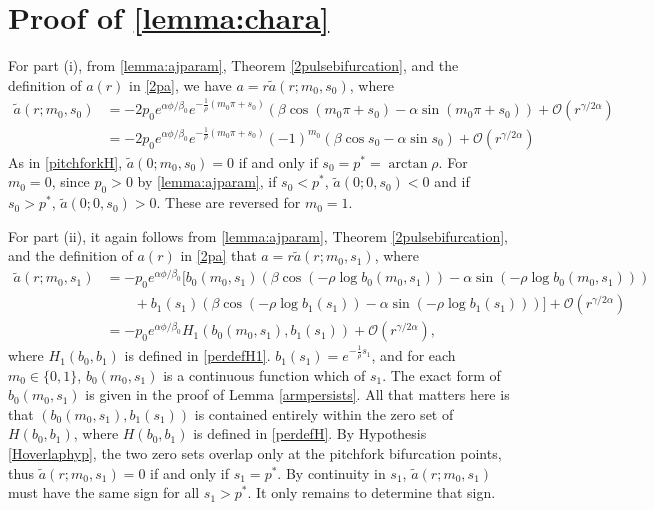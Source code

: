 \documentclass[thesis.tex]{subfiles}
\begin{document}
\section{Proof of \cref{lemma:chara}}

For part (i), from \cref{lemma:ajparam}, Theorem \cref{2pulsebifurcation}, and the definition of $a(r)$ in \cref{2pa}, we have $a = r \tilde{a}(r; m_0, s_0)$, where
\begin{align*}
\tilde{a}(r; m_0, s_0) &= -2 p_0 e^{\alpha \phi/\beta_0} e^{-\frac{1}{\rho}(m_0 \pi + s_0)} \left( \beta \cos\left(m_0 \pi + s_0 \right) - \alpha \sin \left(m_0 \pi + s_0 \right) \right) + \mathcal{O}(r^{\gamma/2\alpha}) \\
&= -2 p_0 e^{\alpha \phi/\beta_0} e^{-\frac{1}{\rho}(m_0 \pi + s_0)} (-1)^{m_0} \left( \beta \cos s_0 - \alpha \sin s_0 \right) + \mathcal{O}(r^{\gamma/2\alpha})
\end{align*}
As in \cref{pitchforkH}, $\tilde{a}(0; m_0, s_0) = 0$ if and only if $s_0 = p^* = \arctan \rho$. For $m_0 = 0$, since $p_0 > 0$ by \cref{lemma:ajparam}, if $s_0 < p^*$, $\tilde{a}(0; 0, s_0) < 0$ and if $s_0 > p^*$, $\tilde{a}(0; 0, s_0) > 0$. These are reversed for $m_0 = 1$.

For part (ii), it again follows from \cref{lemma:ajparam}, Theorem \cref{2pulsebifurcation}, and the definition of $a(r)$ in \cref{2pa} that $a = r \tilde{a}(r; m_0, s_1)$, where
\begin{align*}
\tilde{a}(r; m_0, s_1) &= -p_0 e^{\alpha \phi/\beta_0} \Big[ b_0(m_0, s_1) \left( \beta \cos\left(-\rho \log b_0(m_0, s_1) \right) - \alpha \sin \left(-\rho \log b_0(m_0, s_1) \right) \right) \\
&\qquad+ b_1(s_1) \left( \beta \cos\left(-\rho \log b_1(s_1) \right) - \alpha \sin \left(-\rho \log b_1(s_1) \right) \right) \Big]  + \mathcal{O}(r^{\gamma/2\alpha}) \\
&= -p_0 e^{\alpha \phi/\beta_0} H_1( b_0(m_0, s_1), b_1(s_1) ) + \mathcal{O}(r^{\gamma/2\alpha}),
\end{align*}
where $H_1(b_0, b_1)$ is defined in \cref{perdefH1}.
$b_1(s_1) = e^{-\frac{1}{\rho}s_1}$, and for each $m_0 \in \{ 0, 1 \}$, $b_0(m_0, s_1)$ is a continuous function which of $s_1$. The exact form of $b_0(m_0, s_1)$ is given in the proof of Lemma \ref{armpersists}. All that matters here is that $(b_0(m_0, s_1), b_1(s_1))$ is contained entirely within the zero set of $H(b_0, b_1)$, where $H(b_0, b_1)$ is defined in \cref{perdefH}. By Hypothesis \ref{Hoverlaphyp}, the two zero sets overlap only at the pitchfork bifurcation points, thus $\tilde{a}(r; m_0, s_1) = 0$ if and only if $s_1 = p^*$. By continuity in $s_1$, $\tilde{a}(r; m_0, s_1)$ must have the same sign for all $s_1 > p^*$. It only remains to determine that sign.
\end{document}
